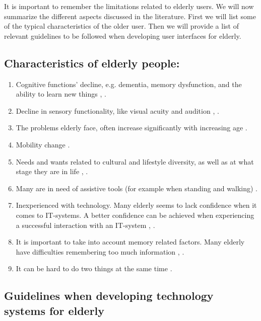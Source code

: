 It is important to remember the limitations related to elderly users. We will now summarize the different aspects discussed in the literature. First we will list some of the typical characteristics of the older user. Then we will provide a list of relevant guidelines to be followed when developing user interfaces for elderly. 

\subsection{Characteristics of elderly people:}
\label{subsec:characteristics}
\begin{enumerate}[{C}.1]
\item Cognitive functions' decline, e.g. dementia, memory dysfunction, and the ability to learn new things \cite{Billis}, \cite{gregor}.
\item Decline in sensory functionality, like  visual acuity and audition \cite{Billis}, \cite{gregor}.
\item The problems elderly face, often increase significantly with increasing age \cite{gregor}.
\item Mobility change \cite{Billis}.
\item Needs and wants related to cultural and lifestyle diversity, as well as at what stage they are in life \cite{Billis}, \cite{gregor}.
\item Many are in need of assistive tools (for example when standing and walking) \cite{gregor}.
\item Inexperienced with technology. Many elderly seems to lack confidence when it comes to IT-systems. A better confidence can be achieved when experiencing a successful interaction with an IT-system \cite{Billis}, \cite{gregor}.
\item It is important to take into account memory related factors. Many elderly have difficulties remembering too much information \cite{Billis}, \cite{gregor}.
\item It can be hard to do two things at the same time \cite{bruin}.
\end{enumerate}

\subsection{Guidelines when developing technology systems for elderly}
\label{subsec:guidelines}

